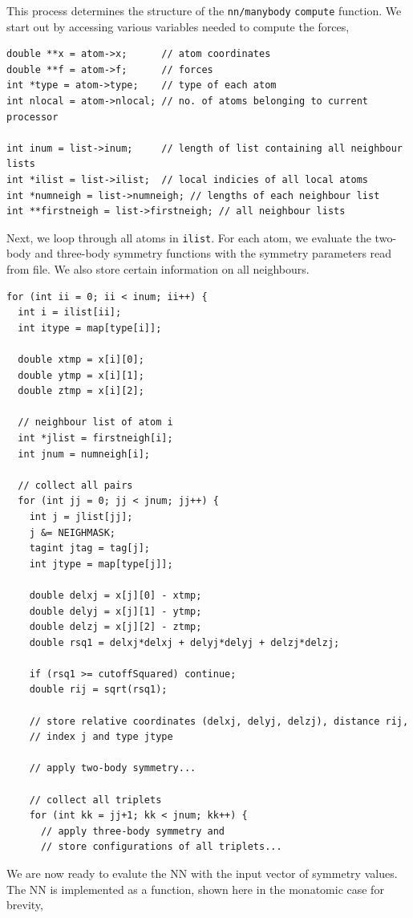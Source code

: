\documentclass[twoside,english]{uiofysmaster}
\begin{document}
This process determines the structure of the \texttt{nn/manybody} \texttt{compute} function. 
We start out by accessing various variables needed to compute the forces,
\begin{verbatim}
double **x = atom->x;      // atom coordinates
double **f = atom->f;      // forces
int *type = atom->type;    // type of each atom	
int nlocal = atom->nlocal; // no. of atoms belonging to current processor  

int inum = list->inum;     // length of list containing all neighbour lists
int *ilist = list->ilist;  // local indicies of all local atoms
int *numneigh = list->numneigh; // lengths of each neighbour list
int **firstneigh = list->firstneigh; // all neighbour lists
\end{verbatim}
Next, we loop through all atoms in \texttt{ilist}. For each atom, we evaluate 
the two-body and three-body symmetry functions with the symmetry parameters read from file. 
We also store certain information on all neighbours. 
\begin{verbatim}
for (int ii = 0; ii < inum; ii++) {
  int i = ilist[ii];
  int itype = map[type[i]];

  double xtmp = x[i][0];
  double ytmp = x[i][1];
  double ztmp = x[i][2];

  // neighbour list of atom i
  int *jlist = firstneigh[i];
  int jnum = numneigh[i];
  
  // collect all pairs
  for (int jj = 0; jj < jnum; jj++) {
    int j = jlist[jj];
    j &= NEIGHMASK;
    tagint jtag = tag[j];
    int jtype = map[type[j]];

    double delxj = x[j][0] - xtmp;
    double delyj = x[j][1] - ytmp;
    double delzj = x[j][2] - ztmp;
    double rsq1 = delxj*delxj + delyj*delyj + delzj*delzj;

    if (rsq1 >= cutoffSquared) continue;   
    double rij = sqrt(rsq1);
    
    // store relative coordinates (delxj, delyj, delzj), distance rij, 
    // index j and type jtype
    
    // apply two-body symmetry...
    
    // collect all triplets
    for (int kk = jj+1; kk < jnum; kk++) {
      // apply three-body symmetry and 
      // store configurations of all triplets...
\end{verbatim}
We are now ready to evalute the NN with the input vector of symmetry values. 
The NN is implemented as a function, shown here in the monatomic case for brevity,
\end{document}

